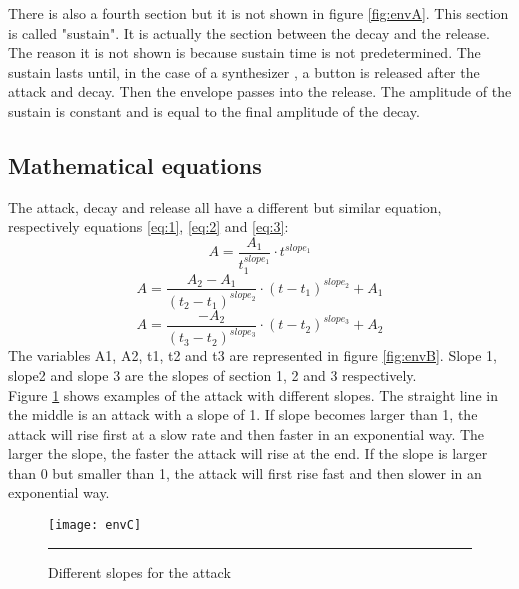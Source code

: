 There is also a fourth section but it is not shown in figure \ref{fig:envA}. This section is called "sustain". It is actually the section between the decay and the release. The reason it is not shown is because sustain time is not predetermined. The sustain lasts until, in the case of a synthesizer , a button is released after the attack and decay. Then the envelope passes into the release. The amplitude of the sustain is constant and is equal to the final amplitude of the decay.
\subsection{Mathematical equations}
The attack, decay and release all have a different but similar equation, respectively equations \ref{eq:1}, \ref{eq:2} and \ref{eq:3}:
\begin{equation}
A = \frac{A_{1}}{t_{1}^{slope_{1}}} \cdot t^{slope_{1}}
\label{eq:1}
\end{equation}
\begin{equation}
A = \frac{A_{2} - A_{1}}{ (t_{2} - t_{1})^{slope_{2}}} \cdot (t  -t_{1})^{slope_{2}} + A_{1}
\label{eq:2}
\end{equation}
\begin{equation}
A = \frac{- A_{2}}{(t_{3} - t_{2})^{slope_{3}}} \cdot (t - t_{2})^{slope_{3}} + A_{2}
\label{eq:3}
\end{equation}
The variables A1, A2, t1, t2 and t3 are represented in figure \ref{fig:envB}. Slope 1, slope2 and slope 3 are the slopes of section 1, 2 and 3 respectively. \\
Figure \ref{fig:slopes} shows examples of the attack with different slopes. The straight line in the middle is an attack with a slope of 1. If slope becomes larger than 1, the attack will rise first at a slow rate and then faster in an exponential way. The larger the slope, the faster the attack will rise at the end. If the slope is larger than 0 but smaller than 1, the attack will first rise fast and then slower in an exponential way.
\begin{figure}[htbp]
\centering
\texttt{[image: envC]}
\rule{30em}{0.5pt}
\caption{Different slopes for the attack}
\label{fig:slopes}
\end{figure}
